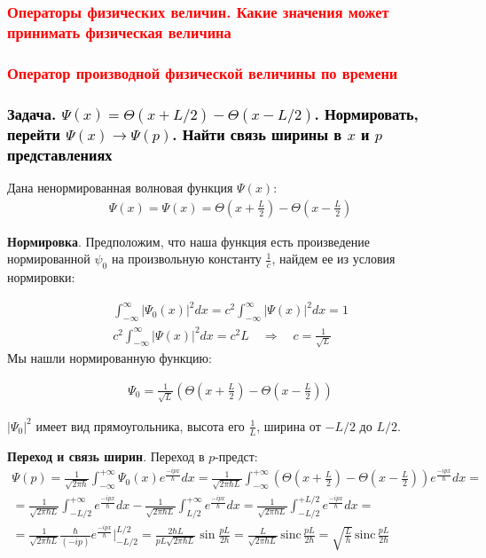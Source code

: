 \subsubsection{\textcolor{red}{Операторы физических величин. Какие значения может принимать физическая величина}}

\subsubsection{\textcolor{red}{Оператор производной физической величины по времени}}

\subsubsection{\textcolor{black}{Задача. $\Psi(x)=\Theta(x+L/2)-\Theta(x-L/2)$. Нормировать, перейти $\Psi(x)\to\Psi(p)$. Найти связь ширины в $x$ и $p$ представлениях}}

Дана ненормированная волновая функция $\Psi(x)$:
\begin{gather*}
\Psi(x)=\Psi(x)=\Theta\left(x+\frac{L}{2}\right)-\Theta\left(x-\frac{L}{2}\right)
\end{gather*}

\textbf{Нормировка}. Предположим, что наша функция есть произведение нормированной $\psi_0$ на произвольную константу $\frac{1}{c}$, найдем ее из условия нормировки:

\begin{gather*}
\int_{-\infty}^{\infty}|\Psi_0(x)|^2 dx=
c^2\int_{-\infty}^{\infty}|\Psi(x)|^2 dx=1\\
c^2\int_{-\infty}^{\infty}|\Psi(x)|^2 dx=
c^2 L \quad\Rightarrow\quad c=\frac{1}{\sqrt{L}}
\end{gather*}
Мы нашли нормированную функцию:

\begin{gather*}
\Psi_0=\frac{1}{\sqrt{L}}\left(
	\Theta\left(x+\frac{L}{2}\right)-\Theta\left(x-\frac{L}{2}\right)
\right)
\end{gather*}

$|\Psi_0|^2$ имеет вид прямоугольника, высота его $\frac{1}{L}$, ширина от $-L/2$ до $L/2$.


\textbf{Переход и связь ширин}. Переход в $p$-предст:
\begin{gather*}
\Psi(p)=\frac{1}{\sqrt{2\pi\hbar}}\int_{-\infty}^{+\infty}\Psi_0(x)e^\frac{-ipx}{\hbar}dx=
\frac{1}{\sqrt{2\pi\hbar L}}\int_{-\infty}^{+\infty}\left(
	\Theta\left(x+\frac{L}{2}\right)-\Theta\left(x-\frac{L}{2}\right)
\right)e^\frac{-ipx}{\hbar}dx=\\=
\frac{1}{\sqrt{2\pi\hbar L}}\int_{-L/2}^{+\infty}e^\frac{-ipx}{\hbar}dx-\frac{1}{\sqrt{2\pi\hbar L}}\int_{L/2}^{+\infty}e^\frac{-ipx}{\hbar}dx=
\frac{1}{\sqrt{2\pi\hbar L}}\int_{-L/2}^{+L/2}e^\frac{-ipx}{\hbar}dx=\\=
\frac{1}{\sqrt{2\pi\hbar L}} \frac{\hbar}{(-ip)} e^\frac{-ipx}{\hbar}\bigg|_{-L/2}^{L/2}=\frac{2\hbar L}{pL\sqrt{2\pi\hbar L}}\sin\frac{pL}{2\hbar}
%
=\frac{L}{\sqrt{2\pi\hbar L}}\,\mathrm{sinc}\,\frac{pL}{2\hbar}
=\sqrt{\frac{L}{h}}\,\mathrm{sinc}\,\frac{pL}{2\hbar}
\end{gather*}

